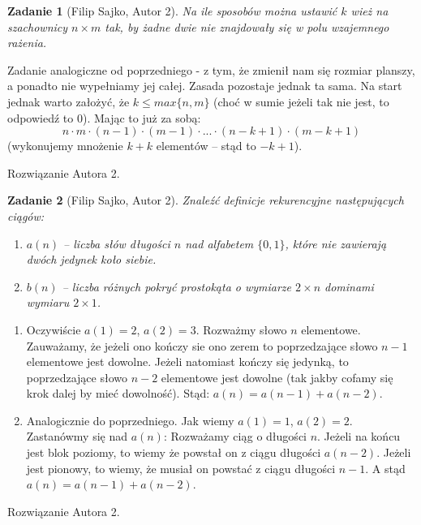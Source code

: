 \documentclass{mwart}
\newtheorem{zad}{Zadanie}[section]
\begin{document}
\begin{zad}[Filip Sajko, Autor 2]
    Na ile sposobów można ustawić $k$ wież na szachownicy $n \times m$
    tak, by żadne dwie nie znajdowały się w polu wzajemnego rażenia.
\end{zad}
\begin{mdframed}
    Zadanie analogiczne od poprzedniego - z tym, że zmienił nam się
    rozmiar planszy, a ponadto nie wypełniamy jej całej. Zasada
    pozostaje jednak ta sama. Na start jednak warto założyć, że
    $k \leq max\{n, m\}$ (choć w sumie jeżeli tak nie jest, to
    odpowiedź to 0). Mając to już za sobą:
    \[n \cdot m \cdot (n-1) \cdot (m-1) \cdot ... \cdot (n - k +1) \cdot (m -k +1)\]
    (wykonujemy mnożenie $k + k$ elementów -- stąd to $-k + 1$).
\end{mdframed}
\begin{mdframed}
    Rozwiązanie Autora 2.
\end{mdframed}




\begin{zad}[Filip Sajko, Autor 2]
    Znaleźć definicje rekurencyjne następujących ciągów:
    \begin{enumerate}
        \item $a(n)$ -- liczba słów długości $n$ nad alfabetem
              $\{0, 1\}$, które nie zawierają dwóch jedynek koło siebie.
        \item  $b(n)$ -- liczba różnych pokryć prostokąta o wymiarze
              $2 \times n$ dominami wymiaru $2 \times 1$.
    \end{enumerate}
\end{zad}
\begin{mdframed}
    \begin{enumerate}

        \item Oczywiście $a(1)=2$, $a(2)=3$.  Rozważmy słowo $n$ elementowe.
              Zauważamy, że jeżeli ono kończy sie ono zerem to poprzedzające słowo $n-1$
              elementowe jest dowolne. Jeżeli natomiast kończy się jedynką,
              to poprzedzające słowo $n-2$ elementowe jest dowolne
              (tak jakby cofamy się krok dalej by mieć dowolność).
              Stąd: $a(n)=a(n-1)+a(n-2)$.
        \item Analogicznie do poprzedniego. Jak wiemy $a(1) = 1$, $a(2) = 2$. Zastanówmy się nad $a(n)$:
              Rozważamy ciąg o długości $n$. Jeżeli na końcu jest blok poziomy,
              to wiemy że powstał on z ciągu długości $a(n-2)$.
              Jeżeli jest pionowy, to wiemy, że musiał on powstać z ciągu długości $n-1$.
              A stąd $a(n) = a(n-1) + a(n-2)$.
    \end{enumerate}
\end{mdframed}
\begin{mdframed}
    Rozwiązanie Autora 2.
\end{mdframed}
\end{document}
